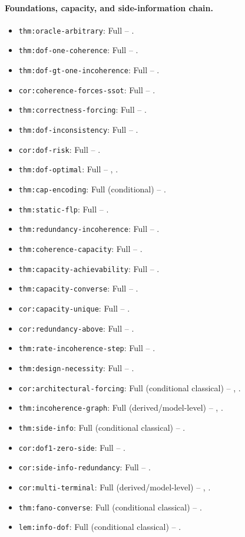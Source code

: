 \paragraph{Foundations, capacity, and side-information chain.}
\begin{itemize}
\item \nolinkurl{thm:oracle-arbitrary}: Full -- .
\item \nolinkurl{thm:dof-one-coherence}: Full -- .
\item \nolinkurl{thm:dof-gt-one-incoherence}: Full -- .
\item \nolinkurl{cor:coherence-forces-ssot}: Full -- .
\item \nolinkurl{thm:correctness-forcing}: Full -- .
\item \nolinkurl{thm:dof-inconsistency}: Full -- .
\item \nolinkurl{cor:dof-risk}: Full -- .
\item \nolinkurl{thm:dof-optimal}: Full -- , .
\item \nolinkurl{thm:cap-encoding}: Full (conditional) -- .
\item \nolinkurl{thm:static-flp}: Full -- .
\item \nolinkurl{thm:redundancy-incoherence}: Full -- .
\item \nolinkurl{thm:coherence-capacity}: Full -- .
\item \nolinkurl{thm:capacity-achievability}: Full -- .
\item \nolinkurl{thm:capacity-converse}: Full -- .
\item \nolinkurl{cor:capacity-unique}: Full -- .
\item \nolinkurl{cor:redundancy-above}: Full -- .
\item \nolinkurl{thm:rate-incoherence-step}: Full -- .
\item \nolinkurl{thm:design-necessity}: Full -- .
\item \nolinkurl{cor:architectural-forcing}: Full (conditional classical) -- , .
\item \nolinkurl{thm:incoherence-graph}: Full (derived/model-level) -- , .
\item \nolinkurl{thm:side-info}: Full (conditional classical) -- .
\item \nolinkurl{cor:dof1-zero-side}: Full -- .
\item \nolinkurl{cor:side-info-redundancy}: Full -- .
\item \nolinkurl{cor:multi-terminal}: Full (derived/model-level) -- , .
\item \nolinkurl{thm:fano-converse}: Full (conditional classical) -- .
\item \nolinkurl{lem:info-dof}: Full (conditional classical) -- .
\end{itemize}

